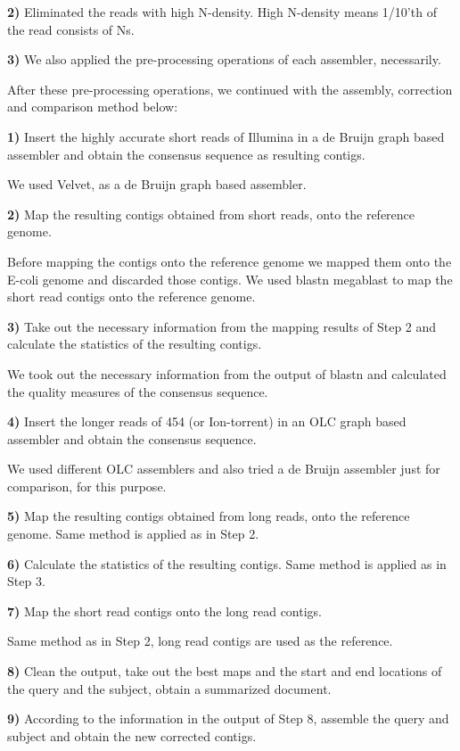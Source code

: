 \documentclass[12pt]{article}
\begin{document}
\textbf{2)} Eliminated the reads with high N-density. High N-density means 1/10'th of the read consists of Ns. 

\textbf{3)} We also applied the pre-processing operations of each assembler, necessarily.

After these pre-processing operations, we continued with the assembly, correction and comparison method below:

\textbf{1)} Insert the highly accurate short reads of Illumina in a de Bruijn graph based assembler and obtain the consensus sequence as resulting contigs.

We used Velvet\cite{velvetZerbino:2008}, as a de Bruijn graph based assembler.

\textbf{2)} Map the resulting contigs obtained from short reads, onto the reference genome. 

Before mapping the contigs onto the reference genome we mapped them onto the E-coli genome and discarded those contigs. We used blastn megablast \cite{blast} to map the short read contigs onto the reference genome.

\textbf{3)} Take out the necessary information from the mapping results of Step 2 and calculate the statistics of the resulting contigs.

We took out the necessary information from the output of blastn and calculated the quality measures of the consensus sequence.

\textbf{4)} Insert the longer reads of 454 (or Ion-torrent) in an OLC graph based assembler and obtain the consensus sequence.

We used different OLC assemblers \cite{celera:2000,sga:2012} and also tried a de Bruijn assembler \cite{spadesBankevich:2012} just for comparison, for this purpose.

\textbf{5)} Map the resulting contigs obtained from long reads, onto the reference genome. Same method is applied as in Step 2.

\textbf{6)} Calculate the statistics of the resulting contigs. Same method is applied as in Step 3.

\textbf{7)} Map the short read contigs onto the long read contigs. 

Same method as in Step 2, long read contigs are used as the reference.

\textbf{8)} Clean the output, take out the best maps and the start and end locations of the query and the subject, obtain a summarized document.

\textbf{9)} According to the information in the output of Step 8, assemble the query and subject and obtain the new corrected contigs.
\end{document}
